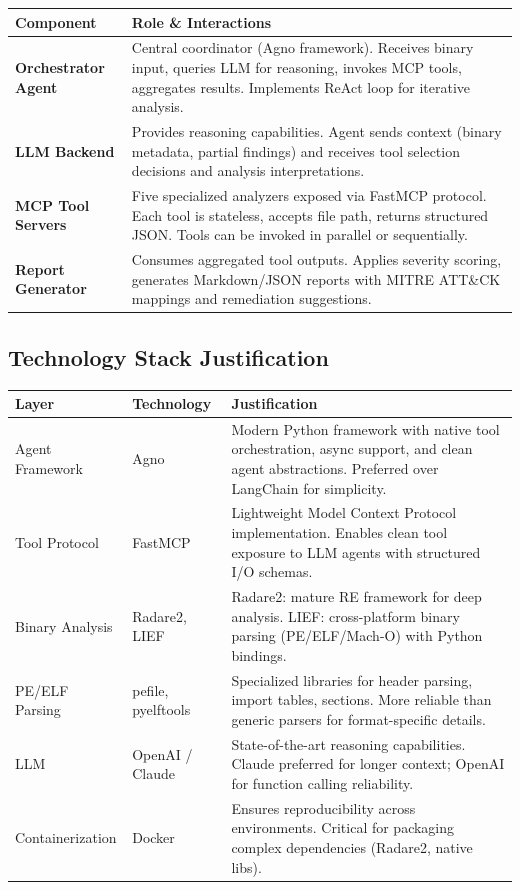 \documentclass[11pt,a4paper]{article}
\begin{document}
\begin{table}[H]
\centering\small
\begin{tabularx}{\textwidth}{l X}
\toprule
\textbf{Component} & \textbf{Role \& Interactions} \\
\midrule
\textbf{Orchestrator Agent} & Central coordinator (Agno framework). Receives binary input, queries LLM for reasoning, invokes MCP tools, aggregates results. Implements ReAct loop for iterative analysis. \\
\textbf{LLM Backend} & Provides reasoning capabilities. Agent sends context (binary metadata, partial findings) and receives tool selection decisions and analysis interpretations. \\
\textbf{MCP Tool Servers} & Five specialized analyzers exposed via FastMCP protocol. Each tool is stateless, accepts file path, returns structured JSON. Tools can be invoked in parallel or sequentially. \\
\textbf{Report Generator} & Consumes aggregated tool outputs. Applies severity scoring, generates Markdown/JSON reports with MITRE ATT\&CK mappings and remediation suggestions. \\
\bottomrule
\end{tabularx}
\end{table}

\subsection{Technology Stack Justification}

\begin{table}[H]
\centering\small
\begin{tabularx}{\textwidth}{l l X}
\toprule
\textbf{Layer} & \textbf{Technology} & \textbf{Justification} \\
\midrule
Agent Framework & Agno & Modern Python framework with native tool orchestration, async support, and clean agent abstractions. Preferred over LangChain for simplicity. \\
Tool Protocol & FastMCP & Lightweight Model Context Protocol implementation. Enables clean tool exposure to LLM agents with structured I/O schemas. \\
Binary Analysis & Radare2, LIEF & Radare2: mature RE framework for deep analysis. LIEF: cross-platform binary parsing (PE/ELF/Mach-O) with Python bindings. \\
PE/ELF Parsing & pefile, pyelftools & Specialized libraries for header parsing, import tables, sections. More reliable than generic parsers for format-specific details. \\
LLM & OpenAI / Claude & State-of-the-art reasoning capabilities. Claude preferred for longer context; OpenAI for function calling reliability. \\
Containerization & Docker & Ensures reproducibility across environments. Critical for packaging complex dependencies (Radare2, native libs). \\
\bottomrule
\end{tabularx}
\end{table}
\end{document}
